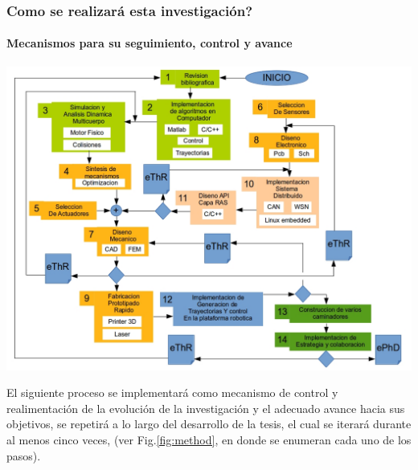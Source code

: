 {\begin{frame}[label=make_framework]
\begin{center}
    \end{center}
  \end{frame}
  \begin{frame}[label=algoritmo_metodologia]
    \frametitle{Como se realizar\'a esta investigaci\'on?}
    \framesubtitle{Mecanismos para su seguimiento, control y avance}
    \begin{center}
      \includegraphics[scale=0.25]{../images/metGen2.png}
    \end{center}
  \end{frame}
}
El siguiente proceso se implementar\'a como mecanismo de control y realimentación de la evoluci\'on de la investigaci\'on y el adecuado avance hacia sus objetivos, se repetir\'a a lo largo del desarrollo de la tesis, el cual se iterar\'a durante al menos cinco veces, (ver Fig.\ref{fig:method}, en donde se enumeran cada uno de los pasos).
